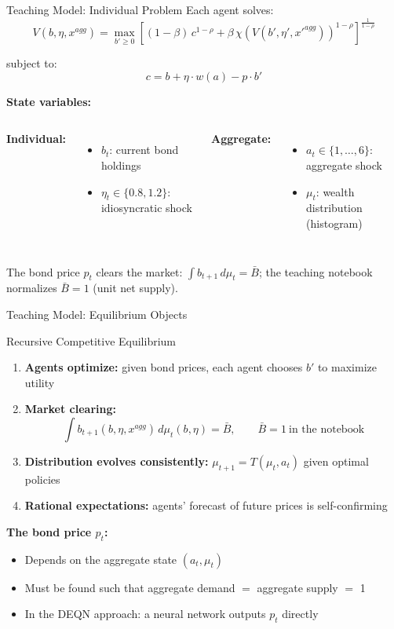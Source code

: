 \documentclass[aspectratio=169,11pt]{beamer}
\newcommand{\emphc}[1]{\textcolor{harvardcrimson}{#1}}
\begin{document}
\begin{frame}{Teaching Model: Individual Problem}
Each agent solves:
\[
V(b, \eta, x^{agg}) = \max_{b' \geq 0} \left[(1-\beta)\, c^{1-\rho} + \beta\, \chi\!\left(V(b', \eta', x'^{agg})\right)^{1-\rho}\right]^{\frac{1}{1-\rho}}
\]

subject to:
\[
c = b + \eta \cdot w(a) - p \cdot b'
\]

\vspace{0.3em}
\textbf{State variables:}
\begin{columns}[T]
\textbf{Individual:}
\begin{itemize}
    \item $b_t$: current bond holdings
    \item $\eta_t \in \{0.8, 1.2\}$: idiosyncratic shock
\end{itemize}

\textbf{Aggregate:}
\begin{itemize}
    \item $a_t \in \{1, \ldots, 6\}$: aggregate shock
    \item $\mu_t$: wealth distribution (histogram)
\end{itemize}
\end{columns}

\vspace{0.3em}
{\small The bond price $p_t$ clears the market: $\int b_{t+1} \, d\mu_t = \bar B$; the teaching notebook normalizes $\bar B=1$ (unit net supply).}
\end{frame}

\begin{frame}{Teaching Model: Equilibrium Objects}
\begin{block}{Recursive Competitive Equilibrium}
\begin{enumerate}
    \item \textbf{Agents optimize:} given bond prices, each agent chooses $b'$ to maximize utility
    \item \textbf{Market clearing:}
    \[
    \int b_{t+1}(b, \eta, x^{agg}) \, d\mu_t(b, \eta) = \bar B,\qquad \bar B=1\ \text{in the notebook}
    \]
    \item \textbf{Distribution evolves consistently:} $\mu_{t+1} = T(\mu_t, a_t)$ given optimal policies
    \item \textbf{Rational expectations:} agents' forecast of future prices is self-confirming
\end{enumerate}
\end{block}

\vspace{0.5em}
\textbf{The bond price $p_t$:}
\begin{itemize}
    \item Depends on the aggregate state $(a_t, \mu_t)$
    \item Must be found such that aggregate demand $=$ aggregate supply $=$ 1
    \item In the DEQN approach: a \emphc{neural network} outputs $p_t$ directly
\end{itemize}
\end{frame}
\end{document}
